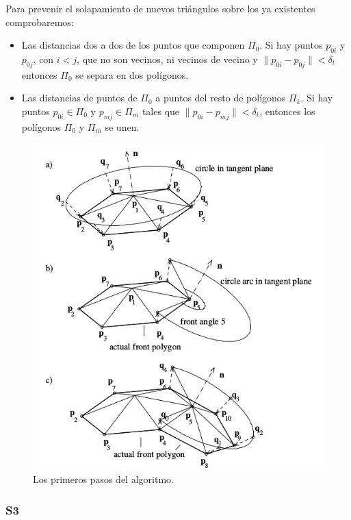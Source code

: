 Para prevenir el solapamiento de nuevos triángulos sobre los ya existentes comprobaremos:
\begin{itemize}
\item Las distancias dos a dos de los puntos que componen $\Pi_0$. Si hay puntos $p_{0i}$ y $p_{0j}$, con $i<j$, que no son vecinos, ni vecinos de vecino y $\| p_{0i} - p_{0j} \| < \delta_t$ entonces $\Pi_0$ se separa en dos polígonos.
\item Las distancias de puntos de $\Pi_0$ a puntos del resto de polígonos $\Pi_k$. Si hay puntos $p_{0i} \in \Pi_0$ y $p_{mj} \in \Pi_m$ tales que $\| p_{0i} - p_{mj} \| < \delta_t$, entonces los polígonos $\Pi_0$ y $\Pi_m$ se unen.
\end{itemize}
\begin{figure}[h]
\centering
\includegraphics[scale=0.5]{images/hartmann3.png}
\caption{Los primeros pasos del algoritmo.}
\end{figure}

\newpage
\subsubsection{S3}

